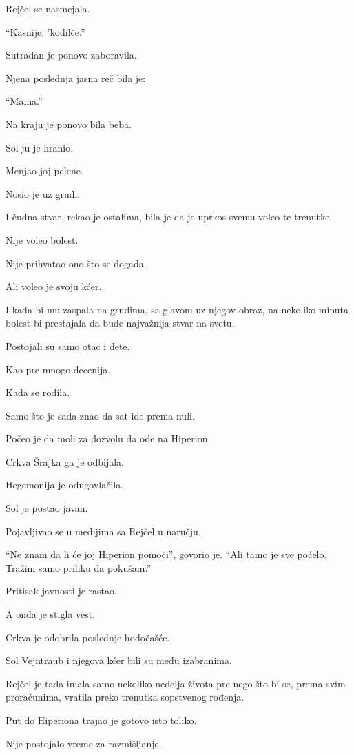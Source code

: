 Rejčel se nasmejala.

``Kasnije, 'kodilče.''

Sutradan je ponovo zaboravila.

Njena poslednja jasna reč bila je:

``Mama.''

\bigskip

Na kraju je ponovo bila beba.

Sol ju je hranio.

Menjao joj pelene.

Nosio je uz grudi.

I čudna stvar, rekao je ostalima, bila je da je uprkos svemu voleo te trenutke.

Nije voleo bolest.

Nije prihvatao ono što se događa.

Ali voleo je svoju kćer.

I kada bi mu zaspala na grudima, sa glavom uz njegov obraz, na nekoliko minuta bolest bi prestajala da bude najvažnija stvar na svetu.

Postojali su samo otac i dete.

Kao pre mnogo decenija.

Kada se rodila.

Samo što je sada znao da sat ide prema nuli.

\bigskip

Počeo je da moli za dozvolu da ode na Hiperion.

Crkva Šrajka ga je odbijala.

Hegemonija je odugovlačila.

Sol je postao javan.

Pojavljivao se u medijima sa Rejčel u naručju.

``Ne znam da li će joj Hiperion pomoći'', govorio je. ``Ali tamo je sve počelo. Tražim samo priliku da pokušam.''

Pritisak javnosti je rastao.

A onda je stigla vest.

Crkva je odobrila poslednje hodočašće.

Sol Vejntraub i njegova kćer bili su među izabranima.

Rejčel je tada imala samo nekoliko nedelja života pre nego što bi se, prema svim proračunima, vratila preko trenutka sopstvenog rođenja.

Put do Hiperiona trajao je gotovo isto toliko.

Nije postojalo vreme za razmišljanje.

